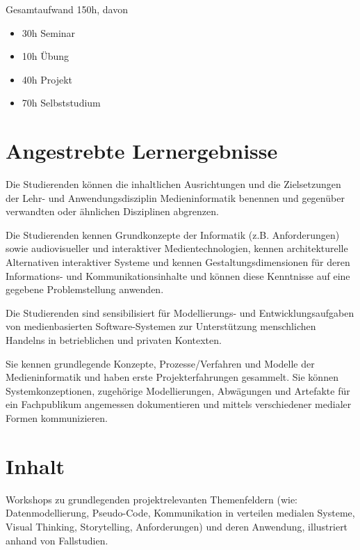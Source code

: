 Gesamtaufwand 150h, davon

\begin{itemize}
\tightlist
\item
  30h Seminar
\item
  10h Übung
\item
  40h Projekt
\item
  70h Selbststudium
\end{itemize}

\section*{Angestrebte
Lernergebnisse\label{/mi-2017/modulbeschreibungen-bachelor/BA_EinfhrungindieMedieninformatik}}\label{angestrebte-lernergebnissepathlabelmi-2017modulbeschreibungen-bachelorbaux5feinfhrungindiemedieninformatik}

Die Studierenden können die inhaltlichen Ausrichtungen und die
Zielsetzungen der Lehr- und Anwendungsdisziplin Medieninformatik
benennen und gegenüber verwandten oder ähnlichen Disziplinen abgrenzen.

Die Studierenden kennen Grundkonzepte der Informatik (z.B.
Anforderungen) sowie audiovisueller und interaktiver Medientechnologien,
kennen architekturelle Alternativen interaktiver Systeme und kennen
Gestaltungsdimensionen für deren Informations- und Kommunikationsinhalte
und können diese Kenntnisse auf eine gegebene Problemstellung anwenden.

Die Studierenden sind sensibilisiert für Modellierungs- und
Entwicklungsaufgaben von medienbasierten Software-Systemen zur
Unterstützung menschlichen Handelns in betrieblichen und privaten
Kontexten.

Sie kennen grundlegende Konzepte, Prozesse/Verfahren und Modelle der
Medieninformatik und haben erste Projekterfahrungen gesammelt. Sie
können Systemkonzeptionen, zugehörige Modellierungen, Abwägungen und
Artefakte für ein Fachpublikum angemessen dokumentieren und mittels
verschiedener medialer Formen kommunizieren.

\section*{Inhalt\label{/mi-2017/modulbeschreibungen-bachelor/BA_EinfhrungindieMedieninformatik}}\label{inhaltpathlabelmi-2017modulbeschreibungen-bachelorbaux5feinfhrungindiemedieninformatik}

Workshops zu grundlegenden projektrelevanten Themenfeldern (wie:
Datenmodellierung, Pseudo-Code, Kommunikation in verteilen medialen
Systeme, Visual Thinking, Storytelling, Anforderungen) und deren
Anwendung, illustriert anhand von Fallstudien.

